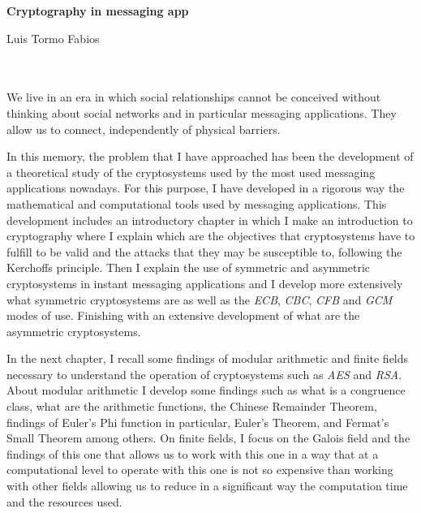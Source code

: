 \thispagestyle{empty}


\begin{center}
{\large\bfseries Cryptography in messaging app}\\
\end{center}
\begin{center}
Luis Tormo Fabios\\
\end{center}

\\

\vspace{0.7cm}
\\

We live in an era in which social relationships cannot be conceived without thinking about social networks and in particular messaging applications. They allow us to connect, independently of physical barriers.

In this memory, the problem that I have approached has been the development of a theoretical study of the cryptosystems used by the most used messaging applications nowadays. For this purpose, I have developed in a rigorous way the mathematical and computational tools used by messaging applications. This development includes an introductory chapter in which I make an introduction to cryptography where I explain which are the objectives that cryptosystems have to fulfill to be valid and the attacks that they may be susceptible to, following the Kerchoffs principle. Then I explain the use of symmetric and asymmetric cryptosystems in instant messaging applications and I develop more extensively what symmetric cryptosystems are as well as the \emph{ECB}, \emph{CBC}, \emph{CFB} and \emph{GCM} modes of use. Finishing with an extensive development of what are the asymmetric cryptosystems.

In the next chapter, I recall some findings of modular arithmetic and finite fields necessary to understand the operation of cryptosystems such as \emph{AES} and \emph{RSA}. About modular arithmetic I develop some findings such as what is a congruence class, what are the arithmetic functions, the Chinese Remainder Theorem, findings of Euler's Phi function in particular, Euler's Theorem, and Fermat's Small Theorem among others.
On finite fields, I focus on the Galois field and the findings of this one that allows us to work with this one in a way that at a computational level to operate with this one is not so expensive than working with other fields allowing us to reduce in a significant way the computation time and the resources used.

